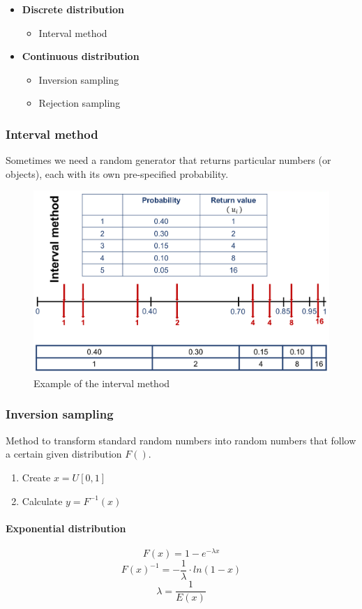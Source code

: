 \begin{itemize}
	\tightlist
	\item \textbf{Discrete distribution}
	\begin{itemize}
		\tightlist
		\item Interval method
	\end{itemize}
	\item \textbf{Continuous distribution}
	\begin{itemize}
		\tightlist
		\item Inversion sampling
		\item Rejection sampling
	\end{itemize}
\end{itemize}

\subsubsection{Interval method}
Sometimes we need a random generator that returns particular numbers (or
objects), each with its own pre-specified probability.

\begin{figure}[H]
	\centering
	\includegraphics[width=.6\textwidth]{figures/IntervalMethod.png}
	\caption{Example of the interval method}
\end{figure}

\subsubsection{Inversion sampling}
Method to transform standard random numbers into random numbers
that follow a certain given distribution $F()$.

\begin{enumerate}
	\tightlist
	\item Create $x = U[0,1]$
	\item Calculate $y = F^{-1}(x)$
\end{enumerate}

\paragraph{Exponential distribution}
\begin{equation}
F(x) = 1 - e^{-\lambda x}
\end{equation}
\begin{equation}
F(x)^{-1} = -\frac{1}{\lambda}\cdot ln(1-x)
\end{equation}
\begin{equation}
\lambda = \frac{1}{E(x)}
\end{equation}

